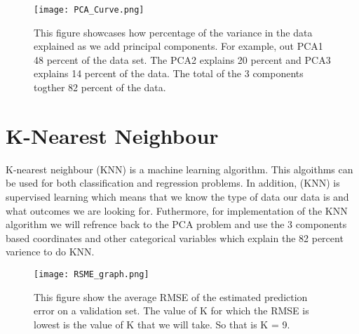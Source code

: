 \documentclass{article}\usepackage[]{graphicx}\usepackage[]{color}
\begin{document}
\begin{figure}[h]
\texttt{[image: PCA\_Curve.png]}
\caption{This figure showcases how percentage of the variance in the data explained as we add principal components. For example, out PCA1 48 percent of the data set. The PCA2 explains 20 percent and PCA3 explains 14 percent of the data. The total of the 3 components togther 82 percent of the data.}
\end{figure}
  

  
  
\section{K-Nearest Neighbour}
K-nearest neighbour (KNN) is a machine learning algorithm. This algoithms can be used for both classification and regression problems. In addition, (KNN) is supervised learning which means that we know the type of data our data is and what outcomes we are looking for. Futhermore, for implementation of the KNN algorithm we will refrence back to the PCA problem and use the 3 components based coordinates and other categorical variables which explain the 82 percent varience to do KNN.

\begin{figure}[h]
\texttt{[image: RSME\_graph.png]}
\caption{This figure show the average RMSE of the estimated prediction error on a validation set. The value of K for which the RMSE is lowest is the value of K that we will take. So that is K = 9.}
\end{figure}
\end{document}
